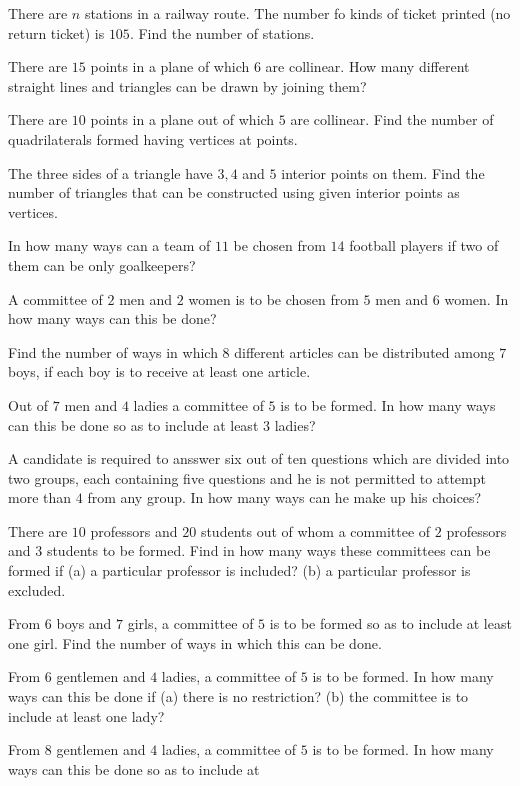 \item There are $n$ stations in a railway route. The number fo kinds of ticket printed (no return ticket) is $105$. Find the number
  of stations.
\item There are $15$ points in a plane of which $6$ are collinear. How many different straight lines and triangles can be drawn by
  joining them?
\item There are $10$ points in a plane out of which $5$ are collinear. Find the number of quadrilaterals formed having vertices at
  points.
\item The three sides of a triangle have $3, 4$ and $5$ interior points on them. Find the number of triangles that can be
  constructed using given interior points as vertices.
\item In how many ways can a team of $11$ be chosen from $14$ football players if two of them can be only goalkeepers?
\item A committee of $2$ men and $2$ women is to be chosen from $5$ men and $6$ women. In how many ways can this be done?
\item Find the number of ways in which $8$ different articles can be distributed among $7$ boys, if each boy is to receive at least
  one article.
\item Out of $7$ men and $4$ ladies a committee of $5$ is to be formed. In how many ways can this be done so as to include at least
  $3$ ladies?
\item A candidate is required to ansswer six out of ten questions which are divided into two groups, each containing five questions
  and he is not permitted to attempt more than $4$ from any group. In how many ways can he make up his choices?
\item There are $10$ professors and $20$ students out of whom a committee of $2$ professors and $3$ students to be formed. Find in
  how many ways these committees can be formed if (a) a particular professor is included? (b) a particular professor is excluded.
\item From $6$ boys and $7$ girls, a committee of $5$ is to be formed so as to include at least one girl. Find the number of ways in
  which this can be done.
\item From $6$ gentlemen and $4$ ladies, a committee of $5$ is to be formed. In how many ways can this be done if (a) there is no
  restriction? (b) the committee is to include at least one lady?
\item From $8$ gentlemen and $4$ ladies, a committee of $5$ is to be formed. In how many ways can this be done so as to include at
